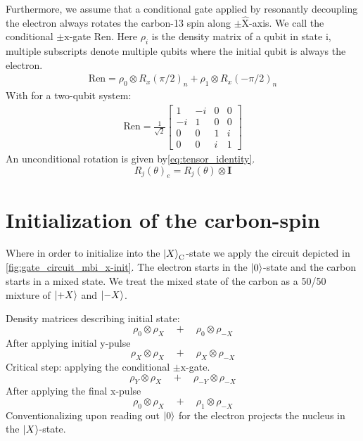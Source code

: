 Furthermore, we assume that a conditional gate applied by resonantly decoupling the electron always rotates the carbon-13 spin along $\pm\hat{\mathrm{X}}$-axis.
We call the conditional $\pm\mathrm{x}$-gate $\bm{\mathrm{Ren}}$. Here $\rho_{i}$ is the density matrix of a qubit in state i, multiple subscripts denote multiple qubits where the initial qubit is always the electron.
\begin{align}
    \bm{\mathrm{Ren}} = \rho_{0}\otimes R_x(\pi/2)_n + \rho_{1}\otimes R_x(-\pi/2)_n
    \end{align}
    With for a two-qubit system:
    \begin{align}
    \bm{\mathrm{Ren}} = \frac{1}{\sqrt{2}}
        \begin{bmatrix}
            1& -i &0 &0 \\
            -i & 1 &0 &0 \\
            0 & 0 &1 &i \\
            0 & 0 &i &1
        \end{bmatrix}
\end{align}
An unconditional rotation is given by\cref{eq:tensor_identity}.
\begin{equation}
    R_j(\theta)_e = R_j(\theta) \otimes \bm{I}
    \label{eq:tensor_identity}
\end{equation}

\section{Initialization of the carbon-spin}

Where in order to initialize into the ${\left\vert{X}\right\rangle}_\mathrm{C}$-state we apply the circuit depicted in \cref{fig:gate_circuit_mbi_x-init}.
The electron starts in the ${\left\vert{0}\right\rangle}$-state and the carbon starts in a mixed state.
We treat the mixed state of the carbon as a 50/50 mixture of ${\left\vert{+X}\right\rangle}$ and ${\left\vert{-X}\right\rangle}$.

Density matrices describing initial state:
\begin{equation}
    \rho_0\otimes \rho_X \quad + \quad \rho_0\otimes \rho_{-X}
    \end{equation}
After applying initial y-pulse
    \begin{equation}
    \rho_X\otimes \rho_X \quad + \quad \rho_X\otimes \rho_{-X}
    \end{equation}
Critical step: applying the conditional $\pm{\mathrm{x}}$-gate.
    \begin{equation}
    \rho_Y\otimes \rho_X \quad + \quad \rho_{-Y}\otimes \rho_{-X}
    \end{equation}
After applying the final x-pulse
    \begin{equation}
    \rho_0\otimes \rho_X \quad + \quad \rho_1\otimes \rho_{-X}
    \end{equation}
Conventionalizing upon reading out ${\left\vert{0}\right\rangle}$ for the electron projects the nucleus in the ${\left\vert{X}\right\rangle}$-state.

